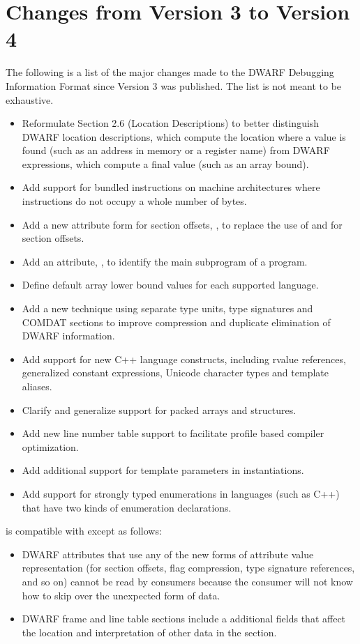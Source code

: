 \section{Changes from Version 3 to Version 4}
The following is a list of the major changes made to the DWARF Debugging Information
Format since Version 3 was published. The list is not meant to be exhaustive.
\begin{itemize}
\item Reformulate 
Section 2.6 (Location Descriptions) 
to better distinguish DWARF location descriptions, which
compute the location where a value is found (such as an address in memory or a register
name) from DWARF expressions, which compute a final value (such as an array bound).
\item Add support for bundled instructions on machine architectures where instructions do not
occupy a whole number of bytes.
\item Add a new attribute form for 
section offsets, , 
to replace the use
of  and  for section offsets.
\item Add an attribute, , to identify the main subprogram of a
program.
\item Define default array lower bound values for each supported language.
\item Add a new technique using separate type units, type signatures and COMDAT sections to
improve compression and duplicate elimination of DWARF information.
\item Add support for new C++ language constructs, including rvalue references, generalized
constant expressions, Unicode character types and template aliases.
\item Clarify and generalize support for packed arrays and structures.
\item Add new line number table support to facilitate profile based compiler optimization.
\item Add additional support for template parameters in instantiations.
\item Add support for strongly typed enumerations in languages (such as C++) that have two
kinds of enumeration declarations.
\end{itemize}
 is compatible with 
 except as follows:
\begin{itemize}
\item DWARF attributes that use any of the new forms of attribute value representation (for
section offsets, flag compression, type signature references, and so on) cannot be read by
consumers because the consumer will not know how to skip over the
unexpected form of data.
\item DWARF frame and line table sections include a additional fields that affect the location
and interpretation of other data in the section.
\end{itemize}

